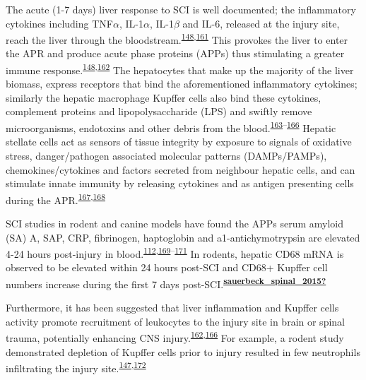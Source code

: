 \documentclass[
]{article}
\begin{document}
The acute (1-7 days) liver response to SCI is well documented; the inflammatory cytokines including TNF\(\alpha\), IL-1\(\alpha\), IL-1\(\beta\) and IL-6, released at the injury site, reach the liver through the bloodstream.\textsuperscript{\protect\hyperlink{ref-fleming_remote_2012}{148},\protect\hyperlink{ref-hundt_assessment_2011}{161}}
This provokes the liver to enter the APR and produce acute phase proteins (APPs) thus stimulating a greater immune response.\textsuperscript{\protect\hyperlink{ref-fleming_remote_2012}{148},\protect\hyperlink{ref-anthony_systemic_2014}{162}}
The hepatocytes that make up the majority of the liver biomass, express receptors that bind the aforementioned inflammatory cytokines; similarly the hepatic macrophage Kupffer cells also bind these cytokines, complement proteins and lipopolysaccharide (LPS) and swiftly remove microorganisms, endotoxins and other debris from the blood.\textsuperscript{\protect\hyperlink{ref-yang_clec4f_2013}{163}--\protect\hyperlink{ref-campbell_central_2005}{166}}
Hepatic stellate cells act as sensors of tissue integrity by exposure to signals of oxidative stress,   danger/pathogen associated molecular patterns (DAMPs/PAMPs), chemokines/cytokines and factors secreted from neighbour hepatic cells, and can stimulate innate immunity by releasing cytokines and as antigen presenting cells during the APR.\textsuperscript{\protect\hyperlink{ref-weiskirchen_cellular_2014}{167},\protect\hyperlink{ref-fujita_roles_2016}{168}}

SCI studies in rodent and canine models have found the APPs serum amyloid (SA) A, SAP, CRP, fibrinogen, haptoglobin and a1-antichymotrypsin are elevated 4-24 hours post-injury in blood.\textsuperscript{\protect\hyperlink{ref-epstein_acute-phase_1999}{112},\protect\hyperlink{ref-pepys_acute_1983}{169}--\protect\hyperlink{ref-steel_major_1994}{171}}
In rodents, hepatic CD68 mRNA is observed to be elevated within 24 hours post-SCI and CD68+ Kupffer cell numbers increase during the first 7 days post-SCI.\textsuperscript{\protect\hyperlink{ref-sauerbeck_spinal_2015}{\textbf{sauerbeck\_spinal\_2015?}}}

Furthermore, it has been suggested that liver inflammation and Kupffer cells activity promote recruitment of leukocytes to the injury site in brain or spinal trauma, potentially enhancing CNS injury.\textsuperscript{\protect\hyperlink{ref-anthony_systemic_2014}{162},\protect\hyperlink{ref-campbell_central_2005}{166}}
For example, a rodent study demonstrated depletion of Kupffer cells prior to injury resulted in few neutrophils infiltrating the injury site.\textsuperscript{\protect\hyperlink{ref-campbell_liver_2008}{147},\protect\hyperlink{ref-campbell_hepatic_2008}{172}}
\end{document}
